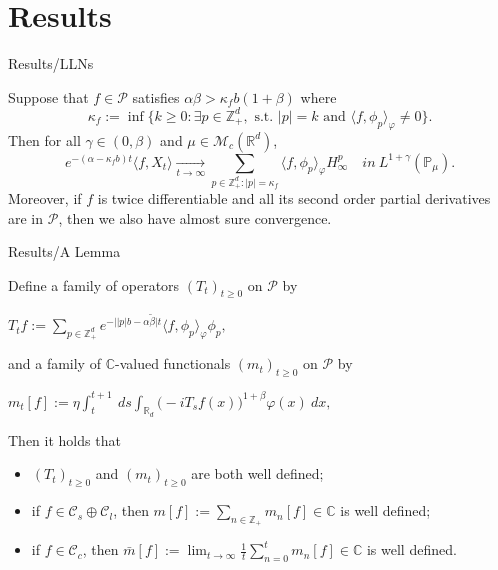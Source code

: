 \documentclass[xcolor=dvipsnames]{beamer}
\begin{document}
\section{Results}
\begin{frame}{Results/LLNs}
  \begin{theorem}
    Suppose that $f \in \mathcal{P}$ satisfies $\alpha \beta > \kappa_f b ( 1 + \beta)$ where
    \[
      \kappa_f :=\inf \{k \geq 0: \exists p \in \mathbb Z_+^d,\text{ s.t. }|p| = k \text{ and } \langle f, \phi_p\rangle_\varphi \neq 0\}.
    \]
Then for all $\gamma\in (0, \beta)$ and  $\mu \in \mathcal M_c(\mathbb R^d)$,
    \[
      e^{-(\alpha-\kappa_fb)t}\langle f, X_t\rangle
      \xrightarrow[t\to \infty]{}\sum_{p\in \mathbb Z_+^d:|p|=\kappa_f}\langle f, \phi_p\rangle_{\varphi} H_{\infty}^p
      \quad in~ L^{1+\gamma}(\mathbb{P}_{\mu}).
    \]
    Moreover, if $f$ is twice differentiable and all its second order partial derivatives are in $\mathcal{P}$, then we also have almost sure convergence.
  \end{theorem}
\end{frame}
\begin{frame}{Results/A Lemma}
  \begin{lemma}
    Define a family of operators $(T_t)_{t\geq 0}$ on $\mathcal P$ by
    \centerline{ \( \displaystyle      
T_tf 
      := \sum_{p \in \mathbb Z_+^d} e^{-\big| |p|b - \alpha \tilde \beta \big|t} \langle f, \phi_p \rangle_{\varphi} \phi_p,
    \)}
    and a family of $\mathbb C$-valued functionals $(m_t)_{t\geq 0}$ on $\mathcal P$ by
   \centerline{ \( \displaystyle
      m_t[f]
      := \eta \int_t^{t+1} ~ds \int_{\mathbb R_d} \big(-iT_sf(x)\big)^{1+\beta} \varphi(x) ~dx ,
    \)}
    Then it holds that
    \begin{itemize}
    \item 
      $(T_t)_{t\geq 0}$ and $(m_t)_{t\geq 0}$ are both well defined;
    \item
      if $f\in \mathcal C_s \oplus \mathcal C_l$, then
      \( \displaystyle
      m[f]
      := \sum_{n \in \mathbb Z_+} m_n[f]
      \in \mathbb C
      \)
      is well defined;
    \item
      if $f \in \mathcal C_c$, then
      \( \displaystyle
      \bar m[f]
      := \lim_{t\to \infty}\frac{1}{t} \sum_{n=0}^t m_n[f]
      \in \mathbb C
      \)
      is well defined.
    \end{itemize}
  \end{lemma}
\end{frame}
\end{document}
